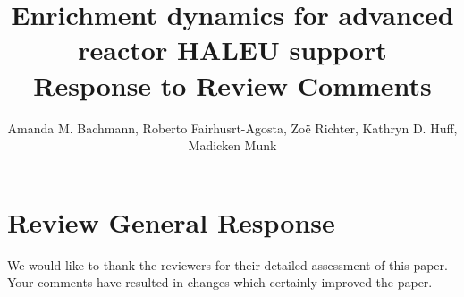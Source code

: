\documentclass[answers,11pt]{exam}
\begin{document}




%

\title{Enrichment dynamics for advanced reactor HALEU support\\
        \large Response to Review Comments}
\author{Amanda M. Bachmann, Roberto Fairhusrt-Agosta, 
Zo\"{e} Richter, Kathryn D. Huff, Madicken Munk}



%
\maketitle
\section*{Review General Response}
We would like to thank the reviewers for their detailed assessment of this
paper. Your comments have resulted in changes which certainly improved the
paper.
\end{document}
